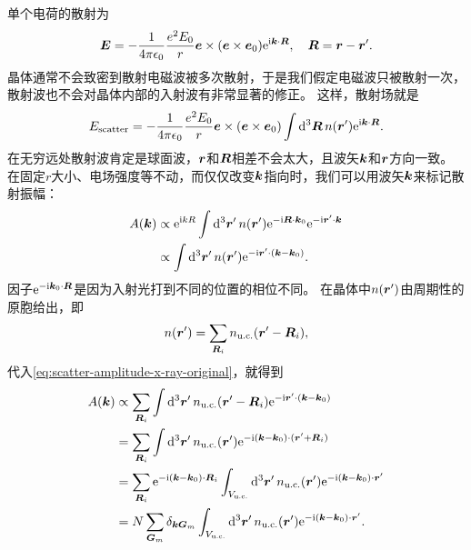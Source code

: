 单个电荷的散射为
\begin{equation}
    \vb*{E} = -\frac{1}{4\pi \epsilon_0} \frac{e^2 E_0}{r} \vb*{e} \times (\vb*{e} \times \vb*{e}_0) \mathrm{e}^{\mathrm{i} \vb*{k} \cdot \vb*{R}}, \quad \vb*{R} = \vb*{r} - \vb*{r}'.
\end{equation}
晶体通常不会致密到散射电磁波被多次散射，于是我们假定电磁波只被散射一次，散射波也不会对晶体内部的入射波有非常显著的修正。
这样，散射场就是
\begin{equation}
    E_\text{scatter} = -\frac{1}{4\pi \epsilon_0} \frac{e^2 E_0}{r} \vb*{e} \times (\vb*{e} \times \vb*{e}_0) \int \dd[3]{\vb*{R}} n(\vb*{r}') \mathrm{e}^{\mathrm{i} \vb*{k} \cdot \vb*{R}}.
\end{equation}
在无穷远处散射波肯定是球面波，$\vb*{r}$和$\vb*{R}$相差不会太大，且波矢$\vb*{k}$和$\vb*{r}$方向一致。
在固定$r$大小、电场强度等不动，而仅仅改变$\vb*{k}$指向时，我们可以用波矢$\vb*{k}$来标记散射振幅：
\begin{equation}
    \begin{aligned}
        A(\vb*{k}) &\propto \mathrm{e}^{\mathrm{i} k R} \int \dd[3]{\vb*{r}'} n(\vb*{r}') \mathrm{e}^{- \mathrm{i} \vb*{R} \cdot \vb*{k}_0} \mathrm{e}^{- \mathrm{i} \vb*{r}' \cdot \vb*{k}} \\
        &\propto \int \dd[3]{\vb*{r}'} n(\vb*{r}') \mathrm{e}^{- \mathrm{i} \vb*{r}' \cdot (\vb*{k} - \vb*{k}_0)}.
    \end{aligned}
    \label{eq:scatter-amplitude-x-ray-original}
\end{equation}
因子$\mathrm{e}^{- \mathrm{i} \vb*{k}_0 \cdot \vb*{R}}$是因为入射光打到不同的位置的相位不同。
在晶体中$n(\vb*{r}')$由周期性的原胞给出，即
\begin{equation}
    n(\vb*{r}') = \sum_{\vb*{R}_i} n_\text{u.c.}(\vb*{r}' - \vb*{R}_i),
\end{equation}
代入\eqref{eq:scatter-amplitude-x-ray-original}，就得到
\[
    \begin{aligned}
        A(\vb*{k}) &\propto \sum_{\vb*{R}_i} \int \dd[3]{\vb*{r}'} n_\text{u.c.}(\vb*{r}' - \vb*{R}_i) \mathrm{e}^{-\mathrm{i} \vb*{r}' \cdot (\vb*{k} - \vb*{k}_0)} \\
        &= \sum_{\vb*{R}_i} \int \dd[3]{\vb*{r}'} n_\text{u.c.}(\vb*{r}') \mathrm{e}^{-\mathrm{i} (\vb*{k} - \vb*{k}_0) \cdot (\vb*{r}' + \vb*{R}_i)} \\
        &= \sum_{\vb*{R}_i} \mathrm{e}^{-\mathrm{i} (\vb*{k} - \vb*{k}_0) \cdot \vb*{R}_i} \int_{V_{\text{u.c.}}} \dd[3]{\vb*{r}'} n_\text{u.c.}(\vb*{r}') \mathrm{e}^{-\mathrm{i} (\vb*{k} - \vb*{k}_0) \cdot \vb*{r}'} \\
        &= N \sum_{\vb*{G}_m} \delta_{\vb*{k} \vb*{G}_m} \int_{V_{\text{u.c.}}} \dd[3]{\vb*{r}'} n_\text{u.c.}(\vb*{r}') \mathrm{e}^{-\mathrm{i} (\vb*{k} - \vb*{k}_0) \cdot \vb*{r}'}.
    \end{aligned}
\]
